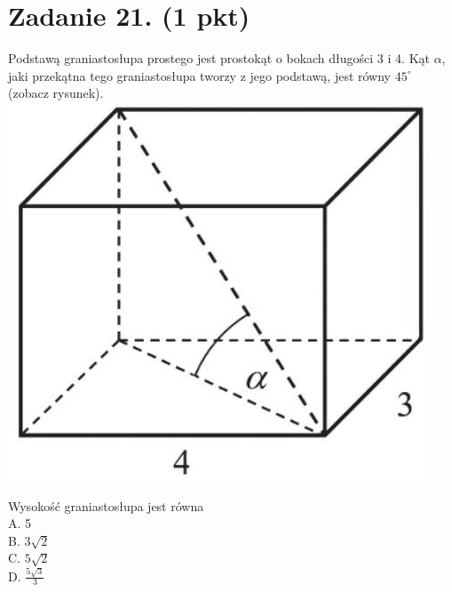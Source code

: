\documentclass[10pt]{article}
\begin{document}
\section*{Zadanie 21. (1 pkt)}
Podstawą graniastosłupa prostego jest prostokąt o bokach długości 3 i 4. Kąt \(\alpha\), jaki przekątna tego graniastosłupa tworzy z jego podstawą, jest równy \(45^{\circ}\) (zobacz rysunek).\\
\includegraphics[max width=\textwidth, center]{2024_11_21_9383c97fb44abf35abe9g-10(2)}

Wysokość graniastosłupa jest równa\\
A. 5\\
B. \(3 \sqrt{2}\)\\
C. \(5 \sqrt{2}\)\\
D. \(\frac{5 \sqrt{3}}{3}\)
\end{document}
